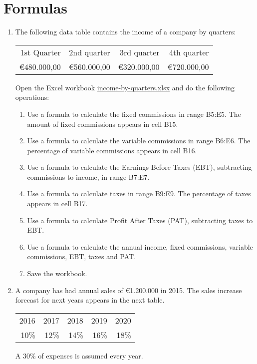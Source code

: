 
\section{Formulas}
\begin{enumerate}[leftmargin=*,resume]
\item \label{ex-income-quarters}The following data table contains the income of a company by quarters:
\begin{center} 
\begin{tabular}{rrrr}
\toprule 
1st Quarter & 2nd quarter & 3rd quarter & 4th quarter\\

€480.000,00 &  €560.000,00 & €320.000,00 & €720.000,00\\
\bottomrule
\end{tabular}
\end{center}

Open the Excel workbook
\href{http://aprendeconalf.es/office/excel/exercises/formulas/income-by-quarters.xlsx}{\textsf{income-by-quarters.xlsx}}
and do the following operations:

\begin{enumerate}
\item Use a formula to calculate the fixed commissions in range B5:E5. The amount of fixed commissions appears in cell B15.
\item Use a formula to calculate the variable commissions in range B6:E6. The percentage of variable commissions appears
in cell B16.
\item Use a formula to calculate the Earnings Before Taxes (EBT), subtracting commissions to income, in range B7:E7.
\item Use a formula to calculate taxes in range B9:E9. The percentage of taxes appears in cell B17.
\item Use a formula to calculate Profit After Taxes (PAT), subtracting taxes to EBT.
\item Use a formula to calculate the annual income, fixed commissions, variable commissions, EBT, taxes and PAT. 
\item Save the workbook. 
\end{enumerate}


\item \label{ex-sales-forecast}A company has had annual sales of €1.200.000 in 2015.
The sales increase forecast for next years appears in the next table.
\begin{center} 
\begin{tabular}{rrrrr}
\toprule 
2016 & 2017 & 2018 & 2019 & 2020\\
10\% & 12\% & 14\% & 16\% & 18\%\\
\bottomrule
\end{tabular}
\end{center}
A 30\% of expenses is assumed every year.


\end{enumerate}
